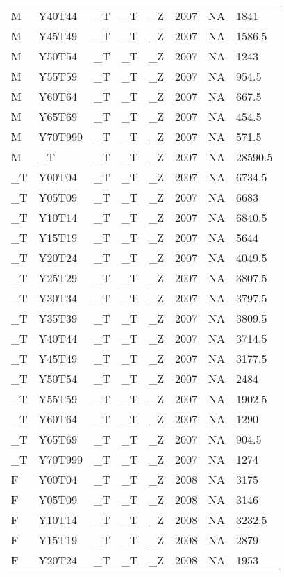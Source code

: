 \begin{longtable}[t]{llllllll}
M & Y40T44 & \_T & \_T & \_Z & 2007 & NA & 1841\\
M & Y45T49 & \_T & \_T & \_Z & 2007 & NA & 1586.5\\
M & Y50T54 & \_T & \_T & \_Z & 2007 & NA & 1243\\
M & Y55T59 & \_T & \_T & \_Z & 2007 & NA & 954.5\\
\addlinespace
M & Y60T64 & \_T & \_T & \_Z & 2007 & NA & 667.5\\
M & Y65T69 & \_T & \_T & \_Z & 2007 & NA & 454.5\\
M & Y70T999 & \_T & \_T & \_Z & 2007 & NA & 571.5\\
M & \_T & \_T & \_T & \_Z & 2007 & NA & 28590.5\\
\_T & Y00T04 & \_T & \_T & \_Z & 2007 & NA & 6734.5\\
\addlinespace
\_T & Y05T09 & \_T & \_T & \_Z & 2007 & NA & 6683\\
\_T & Y10T14 & \_T & \_T & \_Z & 2007 & NA & 6840.5\\
\_T & Y15T19 & \_T & \_T & \_Z & 2007 & NA & 5644\\
\_T & Y20T24 & \_T & \_T & \_Z & 2007 & NA & 4049.5\\
\_T & Y25T29 & \_T & \_T & \_Z & 2007 & NA & 3807.5\\
\addlinespace
\_T & Y30T34 & \_T & \_T & \_Z & 2007 & NA & 3797.5\\
\_T & Y35T39 & \_T & \_T & \_Z & 2007 & NA & 3809.5\\
\_T & Y40T44 & \_T & \_T & \_Z & 2007 & NA & 3714.5\\
\_T & Y45T49 & \_T & \_T & \_Z & 2007 & NA & 3177.5\\
\_T & Y50T54 & \_T & \_T & \_Z & 2007 & NA & 2484\\
\addlinespace
\_T & Y55T59 & \_T & \_T & \_Z & 2007 & NA & 1902.5\\
\_T & Y60T64 & \_T & \_T & \_Z & 2007 & NA & 1290\\
\_T & Y65T69 & \_T & \_T & \_Z & 2007 & NA & 904.5\\
\_T & Y70T999 & \_T & \_T & \_Z & 2007 & NA & 1274\\
F & Y00T04 & \_T & \_T & \_Z & 2008 & NA & 3175\\
\addlinespace
F & Y05T09 & \_T & \_T & \_Z & 2008 & NA & 3146\\
F & Y10T14 & \_T & \_T & \_Z & 2008 & NA & 3232.5\\
F & Y15T19 & \_T & \_T & \_Z & 2008 & NA & 2879\\
F & Y20T24 & \_T & \_T & \_Z & 2008 & NA & 1953\\

\end{longtable}

